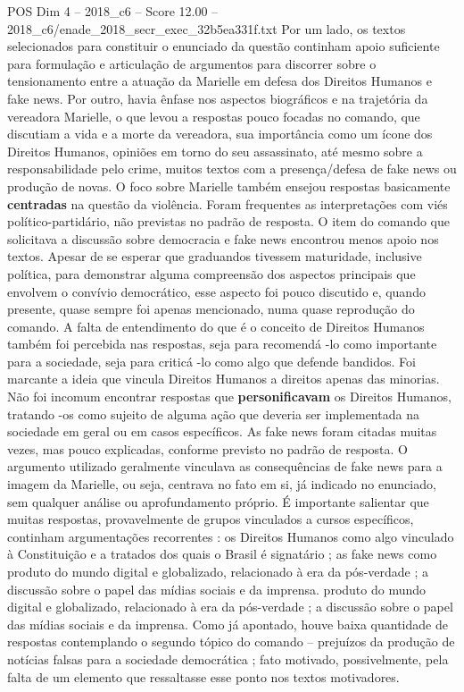 \begin{textsample}{POS Dim 4 – 2018\_c6 – Score 12.00 – 2018\_c6/enade\_2018\_secr\_exec\_32b5ea331f.txt}
Por um lado, os textos selecionados para constituir o enunciado da questão continham apoio suficiente para formulação e articulação de argumentos para discorrer sobre o tensionamento entre a atuação da Marielle em defesa dos Direitos Humanos e fake news.
Por outro, havia ênfase nos aspectos biográficos e na trajetória da vereadora Marielle, o que levou a respostas pouco focadas no comando, que discutiam a vida e a morte da vereadora, sua importância como um ícone dos Direitos Humanos, opiniões em torno do seu assassinato, até mesmo sobre a responsabilidade pelo crime, muitos textos com a presença/defesa de fake news ou produção de novas.
O foco sobre Marielle também ensejou respostas basicamente \textbf{centradas} na questão da violência.
Foram frequentes as interpretações com viés político-partidário, não previstas no padrão de resposta.
O item do comando que solicitava a discussão sobre democracia e fake news encontrou menos apoio nos textos.
Apesar de se esperar que graduandos tivessem maturidade, inclusive política, para demonstrar alguma compreensão dos aspectos principais que envolvem o convívio democrático, esse aspecto foi pouco discutido e, quando presente, quase sempre foi apenas mencionado, numa quase reprodução do comando.
A falta de entendimento do que é o conceito de Direitos Humanos também foi percebida nas respostas, seja para recomendá -lo como importante para a sociedade, seja para criticá -lo como algo que defende bandidos.
Foi marcante a ideia que vincula Direitos Humanos a direitos apenas das minorias.
Não foi incomum encontrar respostas que \textbf{personificavam} os Direitos Humanos, tratando -os como sujeito de alguma ação que deveria ser implementada na sociedade em geral ou em casos específicos.
As fake news foram citadas muitas vezes, mas pouco explicadas, conforme previsto no padrão de resposta.
O argumento utilizado geralmente vinculava as consequências de fake news para a imagem da Marielle, ou seja, centrava no fato em si, já indicado no enunciado, sem qualquer análise ou aprofundamento próprio.
É importante salientar que muitas respostas, provavelmente de grupos vinculados a cursos específicos, continham argumentações recorrentes : os Direitos Humanos como algo vinculado à Constituição e a tratados dos quais o Brasil é signatário ; as fake news como produto do mundo digital e globalizado, relacionado à era da pós-verdade ; a discussão sobre o papel das mídias sociais e da imprensa. produto do mundo digital e globalizado, relacionado à era da pós-verdade ; a discussão sobre o papel das mídias sociais e da imprensa.
Como já apontado, houve baixa quantidade de respostas contemplando o segundo tópico do comando – prejuízos da produção de notícias falsas para a sociedade democrática ; fato motivado, possivelmente, pela falta de um elemento que ressaltasse esse ponto nos textos motivadores.

\end{textsample}
